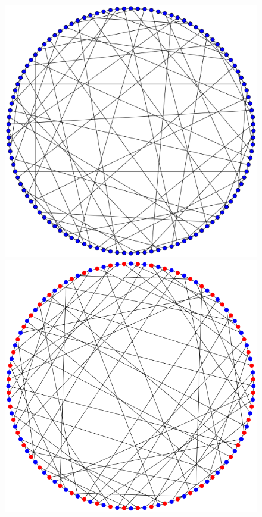 \documentclass[11pt]{beamer}
\begin{document}
\begin{frame}
\begin{center}
\begin{figure}[h!]
\includegraphics[scale=0.06]{Balaban}
\hspace*{3mm}
\includegraphics[scale=0.12]{Ljubljana}
\hspace*{3mm}

\end{figure}
\end{center}
\end{frame}
\end{document}
